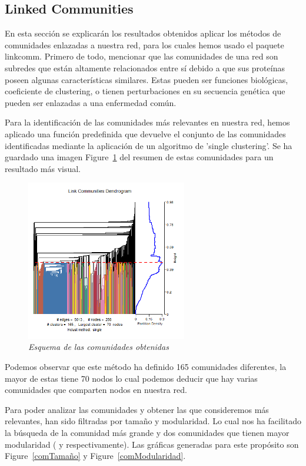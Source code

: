 \subsection{Linked Communities}
En esta sección se explicarán los resultados obtenidos aplicar los métodos de comunidades enlazadas a nuestra red, para los cuales hemos usado el paquete linkcomm. Primero de todo, mencionar que las comunidades de una red son subredes que están altamente relacionados entre sí debido a que sus proteínas poseen algunas características similares. Estas pueden ser funciones biológicas, coeficiente de clustering, o tienen perturbaciones en su secuencia genética que pueden ser enlazadas a una enfermedad común.

Para la identificación de las comunidades más relevantes en nuestra red, hemos aplicado una función predefinida que devuelve el conjunto de las comunidades identificadas mediante la aplicación de un algoritmo de 'single clustering'. Se ha guardado una imagen Figure~\ref{comunidades} del resumen de estas comunidades para un resultado más visual.

\begin{figure}[h]
	\centering
	\includegraphics[width=70mm,scale=1.2]{figures/covid_lc_summary.png}
	\caption{\textit{Esquema de las comunidades obtenidas}}
	\label{comunidades}
\end{figure}

Podemos observar que este método ha definido 165 comunidades diferentes, la mayor de estas tiene 70 nodos lo cual podemos deducir que hay varias comunidades que comparten nodos en nuestra red.

Para poder analizar las comunidades y obtener las que consideremos más relevantes, han sido filtradas por tamaño y modularidad. Lo cual nos ha facilitado la búsqueda de la comunidad más grande y dos comunidades que tienen mayor modularidad ( y  respectivamente). Las gráficas generadas para este propósito son Figure~\ref{comTamaño} y Figure~\ref{comModularidad}.

